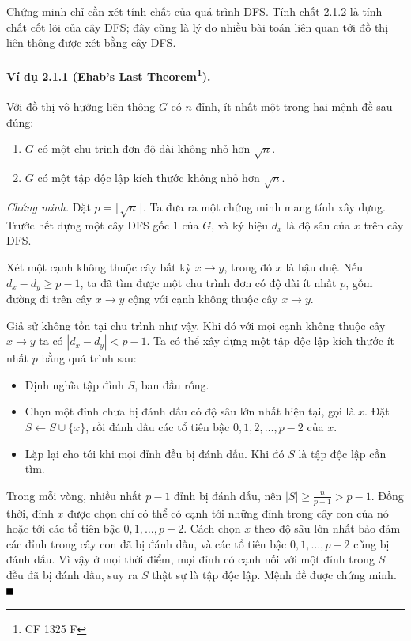 \documentclass[11pt]{article}
\renewcommand{\leadsto}{\mathrel{\longrightarrow}}
\providecommand{\square}{\mathord{\vcenter{\hrule height .6em width .6em}}}
\begin{document}
Chứng minh chỉ cần xét tính chất của quá trình DFS. Tính chất 2.1.2 là tính chất
cốt lõi của cây DFS; đây cũng là lý do nhiều bài toán liên quan tới đồ thị liên
thông được xét bằng cây DFS.

\paragraph{Ví dụ 2.1.1 (Ehab's Last Theorem\protect\footnote{CF 1325 F}).}
Với đồ thị vô hướng liên thông $G$ có $n$ đỉnh, ít nhất một trong hai mệnh đề sau
đúng:
\begin{enumerate}
  \item $G$ có một chu trình đơn độ dài không nhỏ hơn $\sqrt n$.
  \item $G$ có một tập độc lập kích thước không nhỏ hơn $\sqrt n$.
\end{enumerate}

\emph{Chứng minh.}
Đặt $p=\lceil\sqrt n\rceil$. Ta đưa ra một chứng minh mang tính xây dựng.
Trước hết dựng một cây DFS gốc $1$ của $G$, và ký hiệu $d_x$ là độ sâu của $x$
trên cây DFS.

Xét một cạnh không thuộc cây bất kỳ $x\to y$, trong đó $x$ là hậu duệ. Nếu
$d_x-d_y\ge p-1$, ta đã tìm được một chu trình đơn có độ dài ít nhất $p$, gồm
đường đi trên cây $x\leadsto y$ cộng với cạnh không thuộc cây $x\to y$.

Giả sử không tồn tại chu trình như vậy. Khi đó với mọi cạnh không thuộc cây
$x\to y$ ta có $|d_x-d_y|<p-1$. Ta có thể xây dựng một tập độc lập kích thước ít
nhất $p$ bằng quá trình sau:
\begin{itemize}
  \item Định nghĩa tập đỉnh $S$, ban đầu rỗng.
  \item Chọn một đỉnh chưa bị đánh dấu có độ sâu lớn nhất hiện tại, gọi là $x$.
  Đặt $S\leftarrow S\cup\{x\}$, rồi đánh dấu các tổ tiên bậc
  $0,1,2,\ldots,p-2$ của $x$.
  \item Lặp lại cho tới khi mọi đỉnh đều bị đánh dấu. Khi đó $S$ là tập độc lập
  cần tìm.
\end{itemize}

Trong mỗi vòng, nhiều nhất $p-1$ đỉnh bị đánh dấu, nên
$|S|\ge \frac{n}{p-1}>p-1$. Đồng thời, đỉnh $x$ được chọn chỉ có thể có cạnh tới
những đỉnh trong cây con của nó hoặc tới các tổ tiên bậc $0,1,\ldots,p-2$. Cách
chọn $x$ theo độ sâu lớn nhất bảo đảm các đỉnh trong cây con đã bị đánh dấu, và
các tổ tiên bậc $0,1,\ldots,p-2$ cũng bị đánh dấu. Vì vậy ở mọi thời điểm, mọi
đỉnh có cạnh nối với một đỉnh trong $S$ đều đã bị đánh dấu, suy ra $S$ thật sự
là tập độc lập. Mệnh đề được chứng minh. \hfill$\square$
\end{document}
